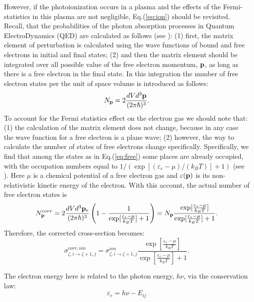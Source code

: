 However, if the photoionization occurs in a plasma and the effects of the Fermi-
statistics in this plasma are not negligible, Eq.(\ref{eq:ion}) should be 
revisited. Recall, that the probabilities of the photon absorption processes in Quantum 
ElectroDynamics (QED) are calculated as follows (see \cite{lp}): (1) first, the matrix 
element of perturbation is calculated using the wave functions of bound and free 
electrons in initial and final states; (2) and then the matrix element should be 
integrated over all possible value of the free electron momentum, ${\bf p}$, as long as there is a 
free electron in the final state. In this integration the number of free electron 
states per the unit of space volume is introduced as follows:
\begin{equation}\label{eq:free}
N_{\bf p}=2\frac {dVd^3{\bf p}}{(2\pi\hbar)^3}.
\end{equation}
To account for the Fermi statistics effect on the electron gas we should note that:
(1) the calculation of the matrix element does not change, because in any case the wave function 
for a free electron is a plane wave; (2) however, the way to calculate the number of states
of free electrons change specifically. Specifically, we find that among the states as in 
Eq.(\ref{eq:free}) some places are already occupied, with the occupation numbers equal to
$1/(\exp[(\varepsilon_e -\mu)/(k_BT)]+1)$ (see \cite{ll}). Here $\mu$ is a chemical potential of
a free electron gas and $\varepsilon({\bf p})$ is its non-relativistic kinetic energy of the electron.
With this account, the actual number of free electron states is
\begin{equation}
N^{corr}_{\bf p} =2
\frac{dV d^3{\bf p}_e}{(2\pi\hbar)^3}
\left(
1-\frac1{\exp[\frac{\varepsilon_e -\mu}{k_BT}]+1}\right)=N_{\bf p}
\frac{\exp[\frac{\varepsilon_e -\mu}{k_BT}]}{\exp[\frac{\varepsilon_e -\mu}{k_BT}]+1}.
\end{equation}
Therefore, the corrected cross-section becomes:
\begin{equation}
\sigma^{corr,ion}_{\zeta,i\rightarrow \zeta+1,j} = \sigma^{ion}_{\zeta,i\rightarrow \zeta+1,j} 
\frac{\exp[\frac{\varepsilon_e -\mu}{k_BT}]}{\exp[\frac{\varepsilon_e -\mu}{k_BT}]+1}.
\end{equation}

The electron energy here is related to the photon energy, $h\nu$, via the conservation law:
\begin{equation}\label{eq:cons}
\varepsilon_e = h\nu - E_{ij}
\end{equation}

